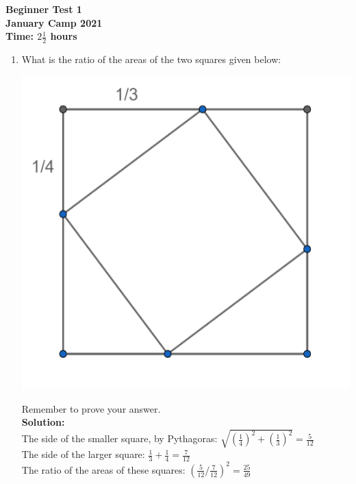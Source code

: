 \documentclass{article}
\begin{document}
\thispagestyle{empty}

\begin{center}
  \textbf{\Large Beginner Test 1}
  \\ \vspace{1em}
  \textbf{\large January Camp 2021}
  \\ \vspace{1em}
  \textbf{\large Time: $2\frac{1}{2}$ hours}
\end{center}

\vspace{24pt}

\begin{enumerate}[1.]


\item What is the ratio of the areas of the two squares given below:
\begin{center}
	\includegraphics[scale=0.4]{beginner_test_1_img_2.png}	
\end{center}
Remember to prove your answer.\\%

\textbf{Solution:}\\
The side of the smaller square, by Pythagoras: $\sqrt{(\frac{1}{4})^2+(\frac{1}{3})^2}=\frac{5}{12}$\\
The side of the larger square: $\frac{1}{3}+\frac{1}{4}=\frac{7}{12}$\\
The ratio of the areas of these squares: $(\frac{5}{12}/\frac{7}{12})^2=\frac{25}{49}$\\




\end{enumerate}
\end{document}
